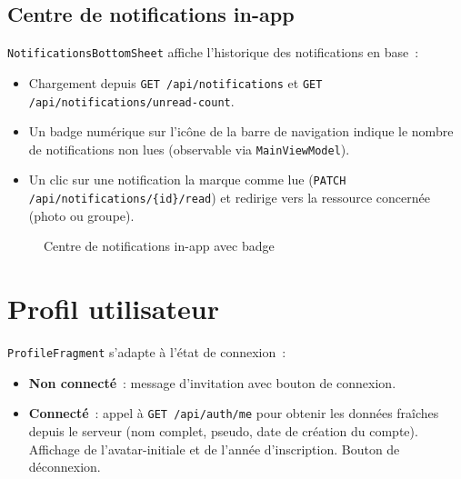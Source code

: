 \documentclass[12pt, a4paper]{report}
\begin{document}
\subsection{Centre de notifications in-app}

\texttt{NotificationsBottomSheet} affiche l'historique des notifications en base~:
\begin{itemize}
  \item Chargement depuis \texttt{GET /api/notifications} et \texttt{GET /api/notifications/unread-count}.
  \item Un badge numérique sur l'icône de la barre de navigation indique le nombre
        de notifications non lues (observable via \texttt{MainViewModel}).
  \item Un clic sur une notification la marque comme lue (\texttt{PATCH /api/notifications/\{id\}/read})
        et redirige vers la ressource concernée (photo ou groupe).
\end{itemize}

\begin{figure}[H]
  \centering
  \caption{Centre de notifications in-app avec badge}
  \label{fig:notifications}
\end{figure}

\section{Profil utilisateur}

\texttt{ProfileFragment} s'adapte à l'état de connexion~:
\begin{itemize}
  \item \textbf{Non connecté}~: message d'invitation avec bouton de connexion.
  \item \textbf{Connecté}~: appel à \texttt{GET /api/auth/me} pour obtenir les données
        fraîches depuis le serveur (nom complet, pseudo, date de création du compte).
        Affichage de l'avatar-initiale et de l'année d'inscription.
        Bouton de déconnexion.
\end{itemize}
\end{document}
